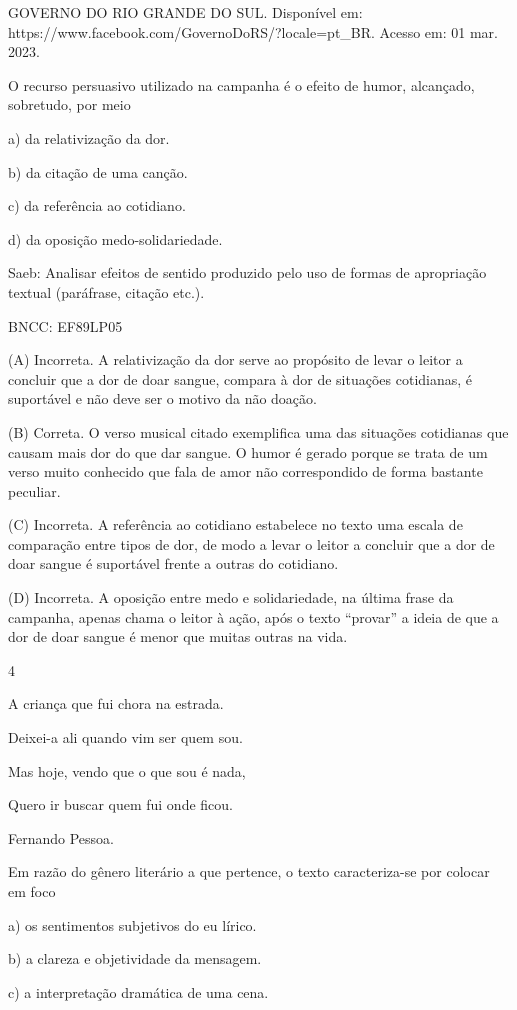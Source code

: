 GOVERNO DO RIO GRANDE DO SUL. Disponível em:
https://www.facebook.com/GovernoDoRS/?locale=pt\_BR. Acesso em: 01 mar.
2023.

O recurso persuasivo utilizado na campanha é o efeito de humor,
alcançado, sobretudo, por meio

a) da relativização da dor.

b) da citação de uma canção.

c) da referência ao cotidiano.

d) da oposição medo-solidariedade.

Saeb: Analisar efeitos de sentido produzido pelo uso de formas de
apropriação textual (paráfrase, citação etc.).

BNCC: EF89LP05

(A) Incorreta. A relativização da dor serve ao propósito de levar o
leitor a concluir que a dor de doar sangue, compara à dor de situações
cotidianas, é suportável e não deve ser o motivo da não doação.

(B) Correta. O verso musical citado exemplifica uma das situações
cotidianas que causam mais dor do que dar sangue. O humor é gerado
porque se trata de um verso muito conhecido que fala de amor não
correspondido de forma bastante peculiar.

(C) Incorreta. A referência ao cotidiano estabelece no texto uma escala
de comparação entre tipos de dor, de modo a levar o leitor a concluir
que a dor de doar sangue é suportável frente a outras do cotidiano.

(D) Incorreta. A oposição entre medo e solidariedade, na última frase da
campanha, apenas chama o leitor à ação, após o texto ``provar'' a ideia
de que a dor de doar sangue é menor que muitas outras na vida.

\num{4}

A criança que fui chora na estrada.

Deixei-a ali quando vim ser quem sou.

Mas hoje, vendo que o que sou é nada,

Quero ir buscar quem fui onde ficou.

Fernando Pessoa.

Em razão do gênero literário a que pertence, o texto caracteriza-se por
colocar em foco

a) os sentimentos subjetivos do eu lírico.

b) a clareza e objetividade da mensagem.

c) a interpretação dramática de uma cena.

